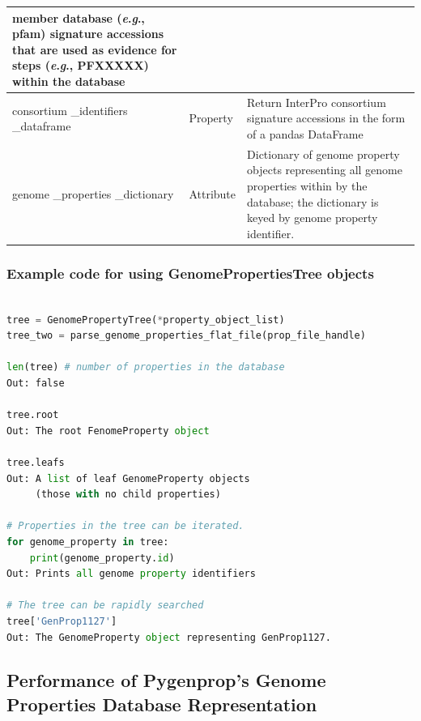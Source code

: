 \begin{longtable}{|p{2.7cm}|p{2cm}|p{10cm}|}
member database (\textit{e}.\textit{g}., \gls{pfam}) signature accessions that are used as 
evidence for steps (\textit{e}.\textit{g}., PFXXXXX) within the database                           
 \\ \hline
consortium \_identifiers \_dataframe   & Property  & Return InterPro consortium signature accessions in the form of a pandas DataFrame  \cite{mckinney2010data}                              
                          \\ \hline
genome \_properties \_dictionary    & Attribute  & Dictionary of genome property 
objects representing all genome properties within by the database; the 
dictionary is keyed by genome property identifier.                              
\\ \hline
\end{longtable}

\pagebreak
\FloatBarrier
\subsubsection{Example code for using GenomePropertiesTree objects}

\begin{lstlisting}[language=Python]

tree = GenomePropertyTree(*property_object_list)
tree_two = parse_genome_properties_flat_file(prop_file_handle)
	
len(tree) # number of properties in the database
Out: false

tree.root
Out: The root FenomeProperty object

tree.leafs
Out: A list of leaf GenomeProperty objects 
     (those with no child properties)

# Properties in the tree can be iterated.
for genome_property in tree: 
	print(genome_property.id)
Out: Prints all genome property identifiers

# The tree can be rapidly searched
tree['GenProp1127'] 
Out: The GenomeProperty object representing GenProp1127.

\end{lstlisting}

\subsection{Performance of Pygenprop's Genome Properties Database 
Representation}

